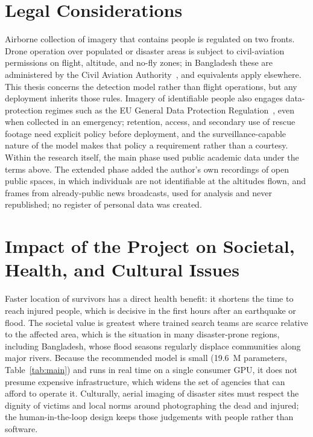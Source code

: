 \documentclass[12pt,a4paper,oneside]{report}
\begin{document}
\section{Legal Considerations}
\label{sec:legal5}
Airborne collection of imagery that contains people is regulated on two
fronts. Drone operation over populated or disaster areas is subject to
civil-aviation permissions on flight, altitude, and no-fly zones; in
Bangladesh these are administered by the Civil Aviation Authority~\cite{caabuav}, and
equivalents apply elsewhere. This thesis concerns the detection model rather
than flight operations, but any deployment inherits those rules. Imagery of
identifiable people also engages data-protection regimes such as the EU
General Data Protection Regulation~\cite{gdpr2016}, even when collected in
an emergency; retention, access, and secondary use of rescue footage need
explicit policy before deployment, and the surveillance-capable nature of
the model makes that policy a requirement rather than a courtesy. Within the
research itself, the main phase used public academic data under the terms
above. The extended phase added the author's own recordings of open public
spaces, in which individuals are not identifiable at the altitudes flown, and
frames from already-public news broadcasts, used for analysis and never
republished; no register of personal data was created.

\section{Impact of the Project on Societal, Health, and Cultural Issues}
Faster location of survivors has a direct health benefit: it shortens the time
to reach injured people, which is decisive in the first hours after an
earthquake or flood. The societal value is greatest where trained search teams
are scarce relative to the affected area, which is the situation in many
disaster-prone regions, including Bangladesh, whose flood seasons regularly
displace communities along major rivers. Because the recommended model is
small (19.6~M parameters, Table~\ref{tab:main}) and runs in real time on a
single consumer GPU, it does not presume expensive infrastructure, which
widens the set of agencies that can afford to operate it. Culturally, aerial
imaging of disaster sites must respect the dignity of victims and local norms
around photographing the dead and injured; the human-in-the-loop design keeps
those judgements with people rather than software.
\end{document}
